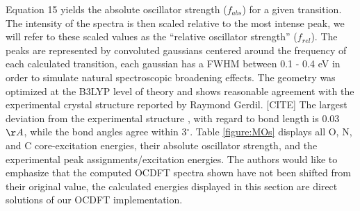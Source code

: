 \documentclass[12pt]{article}
\begin{document}
Equation 15 yields the absolute oscillator strength ($f_{abs}$) for a given transition. The intensity of the spectra is then scaled relative to the most intense peak, we will refer to these scaled values as the ``relative oscillator strength'' ($f_{rel}$). The peaks are represented by convoluted gaussians centered around the frequency of each calculated transition, each gaussian has a FWHM between 0.1 - 0.4 eV in order to simulate natural spectroscopic broadening effects.  The geometry was optimized at the B3LYP level of theory and shows reasonable agreement with the experimental crystal structure reported by Raymond Gerdil. [CITE] The largest deviation from the experimental structure , with regard to bond length is 0.03 $\AA$, while the bond angles agree within 3$^{\circ}$. Table \ref{figure:MOs} displays all O, N, and C core-excitation energies, their absolute oscillator strength, and the experimental peak assignments/excitation energies. The authors would like to emphasize that the computed OCDFT spectra shown have not been shifted from their original value, the calculated energies displayed in this section are direct solutions of our OCDFT implementation. \\
\end{document}
